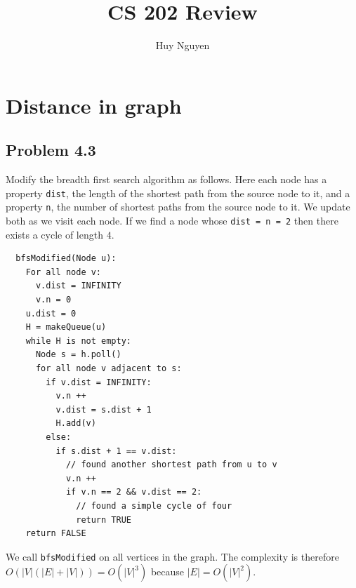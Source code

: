 \documentclass[12pt]{report}
\title{CS 202 Review}
\author{Huy Nguyen}
\newcommand{\co}{\texttt}
\begin{document}
\tableofcontents


\chapter[Chapter 4 Solution]{Distance in graph}

\section{Problem 4.3}
Modify the breadth first search algorithm as follows. Here each node has a property \co{dist}, the length of the shortest path from the source node to it, and a property \co{n}, the number of shortest paths from the source node to it. We update both as we visit each node. If we find a node whose \co{dist = n = 2} then there exists a cycle of length $4$.
\begin{lstlisting}
  bfsModified(Node u):
    For all node v:
      v.dist = INFINITY
      v.n = 0
    u.dist = 0
    H = makeQueue(u)
    while H is not empty:
      Node s = h.poll()
      for all node v adjacent to s:
        if v.dist = INFINITY:
          v.n ++
          v.dist = s.dist + 1
          H.add(v)
        else:
          if s.dist + 1 == v.dist:
            // found another shortest path from u to v
            v.n ++
            if v.n == 2 && v.dist == 2:
              // found a simple cycle of four
              return TRUE
    return FALSE
\end{lstlisting}
We call \co{bfsModified} on all vertices in the graph. The complexity is therefore $O(|V| ( |E| + |V|)) = O(|V|^3)$ because $|E| = O(|V|^2)$.
\end{document}
